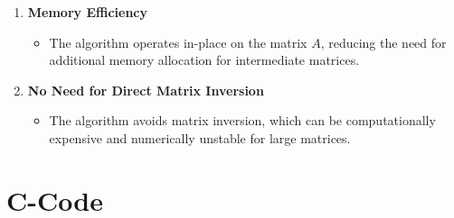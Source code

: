 \documentclass{article}
\begin{document}
\begin{enumerate}
    \item \textbf{Memory Efficiency}
    \begin{itemize}
        \item The algorithm operates in-place on the matrix \( A \), reducing the need for additional memory allocation for intermediate matrices.
    \end{itemize}

    \item \textbf{No Need for Direct Matrix Inversion}
    \begin{itemize}
        \item The algorithm avoids matrix inversion, which can be computationally expensive and numerically unstable for large matrices.
    \end{itemize}
\end{enumerate}
\section{C-Code}
\end{document}
